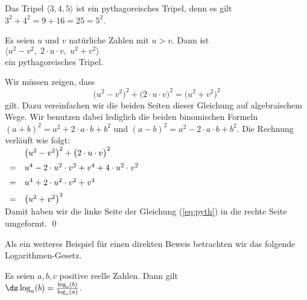 \example
Das Tripel $\langle 3, 4, 5 \rangle$ ist ein pythagoreisches Tripel, denn es gilt
\\[0.2cm]
\hspace*{1.3cm}
$3^2 + 4^2 = 9 + 16 = 25 = 5^2$. \eox


\begin{Satz} 
Es seien $u$ und $v$ nat\"{u}rliche Zahlen mit $u > v$.  Dann ist
\\[0.2cm]
\hspace*{1.3cm}
$\bigl\langle u^2 - v^2,\; 2 \cdot u \cdot v,\; u^2 + v^2 \bigr\rangle$
\\[0.2cm]
ein pythagoreisches Tripel.  
\end{Satz}

\proof
Wir m\"{u}ssen zeigen, dass
\begin{equation}
  \label{eq:pyth}
\bigl( u^2 - v^2 \bigr)^2 + \bigl(2 \cdot u \cdot v \bigr)^2 = \bigl(u^2 + v^2\bigr)^2  
\end{equation}
gilt.  Dazu vereinfachen wir die beiden Seiten dieser Gleichung auf algebraischem Wege.
Wir benutzen dabei lediglich die beiden binomischen Formeln 
$(a + b)^2 = a^2 + 2 \cdot a \cdot b + b^2$ und
$(a - b)^2 = a^2 - 2 \cdot a \cdot b + b^2$.
Die Rechnung verl\"{a}uft wie folgt:
\\[0.2cm]
\hspace*{1.3cm}
$
\begin{array}[t]{cl}
   & \bigl( u^2 - v^2 \bigr)^2 + \bigl(2 \cdot u \cdot v \bigr)^2 \\[0.2cm]
 = & u^4 - 2 \cdot u^2 \cdot v^2 + v^4  + 4 \cdot u^2 \cdot v^2 \\[0.2cm]
 = & u^4 + 2 \cdot u^2 \cdot v^2 + v^4 \\[0.2cm]
 = & \bigl(u^2 + v^2\bigr)^2 
\end{array}
$
\\[0.2cm]
Damit haben wir die linke Seite der Gleichung (\ref{eq:pyth}) in die rechte Seite umgeformt. \qed

Als ein weiteres Beispiel f\"{u}r einen direkten Beweis betrachten wir das folgende Logarithmen-Gesetz.

\begin{Satz}
  Es seien $a,b,c$ positive reelle Zahlen.  Dann gilt
  \\[0.2cm]
  \hspace*{1.3cm}
  $\ds\log_a(b) = \frac{\log_c(b)}{\log_c(a)}$.
\end{Satz}

